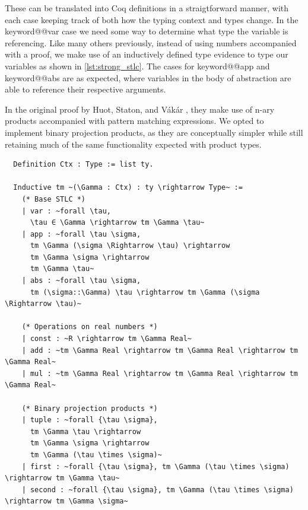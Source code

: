\documentclass[11pt, final]{article}
\makeatletter
\def\Vakar{V\'{a}k\'{a}r}
\def\<#1>{\csname keyword@@#1\endcsname}
\makeatother
\begin{document}
  These can be translated into Coq definitions in a straigtforward manner, with each case keeping track of both how the typing context and types change.
  In the \<var> case we need some way to determine what type the variable is referencing.
  Like many others previously\cite{Benton2011}\cite{Coquand1994}, instead of using numbers accompanied with a proof, we make use of an inductively defined type evidence to type our variables as shown in \ref{lst:strong_stlc}.
  The cases for \<app> and \<abs> are as expected, where variables in the body of abstraction are able to reference their respective arguments.

  In the original proof by Huot, Staton, and \Vakar{} \cite{huot2020correctness}, they make use of n-ary products accompanied with pattern matching expressions. We opted to implement binary projection products, as they are conceptually simpler while still retaining much of the same functionality expected with product types.

  \begin{listing}
    \begin{verbatim}
  Definition Ctx : Type := list ty.

  Inductive tm ~(\Gamma : Ctx) : ty \rightarrow Type~ :=
    (* Base STLC *)
    | var : ~forall \tau,
      \tau ∈ \Gamma \rightarrow tm \Gamma \tau~
    | app : ~forall \tau \sigma,
      tm \Gamma (\sigma \Rightarrow \tau) \rightarrow
      tm \Gamma \sigma \rightarrow
      tm \Gamma \tau~
    | abs : ~forall \tau \sigma,
      tm (\sigma::\Gamma) \tau \rightarrow tm \Gamma (\sigma \Rightarrow \tau)~

    (* Operations on real numbers *)
    | const : ~R \rightarrow tm \Gamma Real~
    | add : ~tm \Gamma Real \rightarrow tm \Gamma Real \rightarrow tm \Gamma Real~
    | mul : ~tm \Gamma Real \rightarrow tm \Gamma Real \rightarrow tm \Gamma Real~

    (* Binary projection products *)
    | tuple : ~forall {\tau \sigma},
      tm \Gamma \tau \rightarrow
      tm \Gamma \sigma \rightarrow
      tm \Gamma (\tau \times \sigma)~
    | first : ~forall {\tau \sigma}, tm \Gamma (\tau \times \sigma) \rightarrow tm \Gamma \tau~
    | second : ~forall {\tau \sigma}, tm \Gamma (\tau \times \sigma) \rightarrow tm \Gamma \sigma~
    \end{verbatim}
    \caption{\<Coq> definition of the base lambda calculus}
    \label{lst:stlc_base}
  \end{listing}
\end{document}
